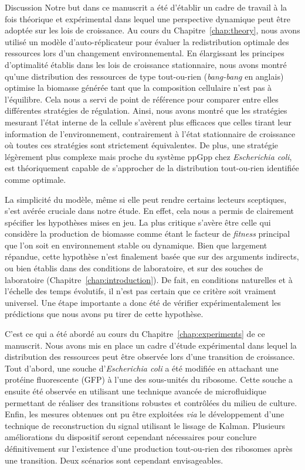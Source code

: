 \begin{chapter_summary}{Discussion}
Notre but dans ce manuscrit a été d'établir un cadre de travail à la fois théorique et expérimental dans lequel une perspective dynamique peut être adoptée sur les lois de croissance.
Au cours du Chapitre~\ref{chap:theory}, nous avons utilisé un modèle d'auto-réplicateur pour évaluer la redistribution optimale des ressources lors d'un changement environnemental.
En élargissant les principes d'optimalité établis dans les lois de croissance stationnaire, nous avons montré qu'une distribution des ressources de type tout-ou-rien (\textit{bang-bang} en anglais) optimise la biomasse générée tant que la composition cellulaire n'est pas à l'équilibre.
Cela nous a servi de point de référence pour comparer entre elles différentes stratégies de régulation.
Ainsi, nous avons montré que les stratégies mesurant l'état interne de la cellule s'avèrent plus efficaces que celles tirant leur information de l'environnement, contrairement à l'état stationnaire de croissance où toutes ces stratégies sont strictement équivalentes.
De plus, une stratégie légèrement plus complexe mais proche du système ppGpp chez \textit{Escherichia coli}, est théoriquement capable de s'approcher de la distribution tout-ou-rien identifiée comme optimale.

La simplicité du modèle, même si elle peut rendre certains lecteurs sceptiques, s'est avérée cruciale dans notre étude.
En effet, cela nous a permis de clairement spécifier les hypothèses mises en jeu.
La plus critique s'avère être celle qui considère la production de biomasse comme étant le facteur de \textit{fitness} principal que l'on soit en environnement stable ou dynamique.
Bien que largement répandue, cette hypothèse n'est finalement basée que sur des arguments indirects, ou bien établis dans des conditions de laboratoire, et sur des souches de laboratoire (Chapitre~\ref{chap:introduction}).
De fait, en conditions naturelles et à l'échelle des temps évolutifs, il n'est pas certain que ce critère soit vraiment universel.
Une étape importante a donc été de vérifier expérimentalement les prédictions que nous avons pu tirer de cette hypothèse.

C'est ce qui a été abordé au cours du Chapitre~\ref{chap:experiments} de ce manuscrit.
Nous avons mis en place un cadre d'étude expérimental dans lequel la distribution des ressources peut être observée lors d'une transition de croissance.
Tout d'abord, une souche d'\textit{Escherichia coli} a été modifiée en attachant une protéine fluorescente (GFP) à l'une des sous-unités du ribosome.
Cette souche a ensuite été observée en utilisant une technique avancée de microfluidique permettant de réaliser des transitions robustes et contrôlées du milieu de culture.
Enfin, les mesures obtenues ont pu être exploitées \textit{via} le développement d'une technique de reconstruction du signal utilisant le lissage de Kalman.
Plusieurs améliorations du dispositif seront cependant nécessaires pour conclure définitivement sur l'existence d'une production tout-ou-rien des ribosomes après une transition.
Deux scénarios sont cependant envisageables.


\end{chapter_summary}
